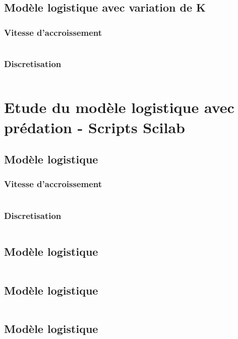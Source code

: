 \documentclass{article}
\begin{document}
\begin{verbatim}
\end{verbatim}

\subsection{Modèle logistique avec variation de K}

\subsubsection{Vitesse d'accroissement}

\begin{verbatim}
\end{verbatim}

\subsubsection{Discretisation}

\begin{verbatim}
\end{verbatim}

\section{Etude du modèle logistique avec prédation - Scripts Scilab}

\subsection{Modèle logistique}

\subsubsection{Vitesse d'accroissement}

\begin{verbatim}
\end{verbatim}

\subsubsection{Discretisation}

\begin{verbatim}
\end{verbatim}

\subsection{Modèle logistique}

\begin{verbatim}
\end{verbatim}

\subsection{Modèle logistique}

\begin{verbatim}
\end{verbatim}

\subsection{Modèle logistique}

\begin{verbatim}
\end{verbatim}
\end{document}
